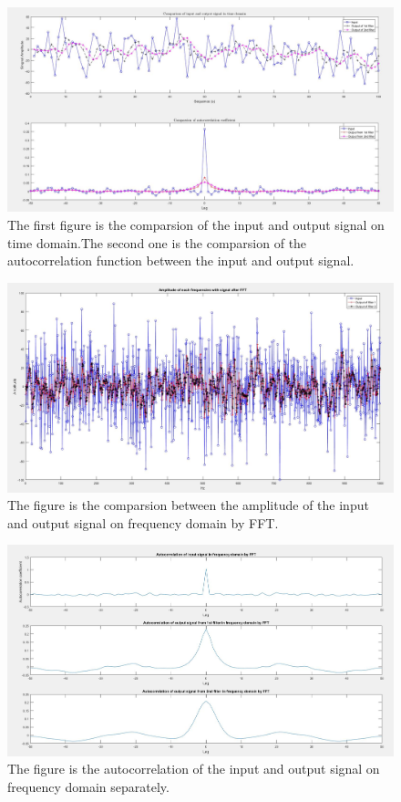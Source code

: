 \documentclass[12pt,a4paper]{article}
\begin{document}
			\begin{figure}[H]
				\includegraphics[scale=0.4]{Problem2h}
				\caption[Properties of input and output signal on time domain]{The first figure is the comparsion of the input and output signal on time domain.The second one is the comparsion of the autocorrelation function between the input and output signal.}
			\end{figure}
			\begin{figure}[H]
				\centering
				\includegraphics[scale=0.4]{Problem2i}
				\caption[FFT of random number on the frequency domain]{The figure is the comparsion between the amplitude of the input and output signal on frequency domain by FFT.}
			\end{figure}
			\begin{figure}[H]
				\centering
				\includegraphics[scale=0.4]{Problem2j}
				\caption[Autocorrelation of the input and output signal on frequency doiman separately]{The figure is the autocorrelation of the input and output signal on frequency domain separately.}
			\end{figure}
\end{document}
